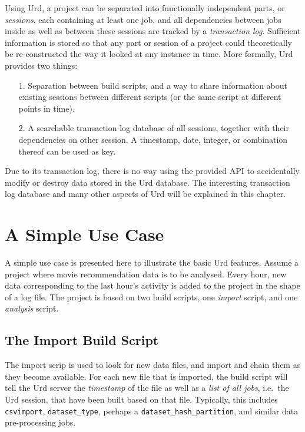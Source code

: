 Using Urd, a project can be separated into functionally independent
parts, or \textsl{sessions}, each containing at least one job, and all
dependencies between jobs inside as well as between these sessions are
tracked by a \textsl{transaction log}.  Sufficient information is
stored so that any part or session of a project could theoretically be
re-constructed the way it looked at any instance in time.  More
formally, Urd provides two things:
\begin{itemize}
\item[1.] Separation between build scripts,
          and a way to share information about existing sessions
          between different scripts (or the same script at different
          points in time).
\item[2.] A searchable transaction log database of all sessions,
          together with their dependencies on other session.  A
          timestamp, date, integer, or combination thereof can be used
          as key.
\end{itemize}
Due to its transaction log, there is no way using the provided API to
accidentally modify or destroy data stored in the Urd database.  The
interesting transaction log database and many other aspects of Urd
will be explained in this chapter.





\section{A Simple Use Case}

A simple use case is presented here to illustrate the basic Urd
features.  Assume a project where movie recommendation data is to be
analysed.  Every hour, new data corresponding to the last hour's
activity is added to the project in the shape of a log file.  The
project is based on two build scripts, one \textsl{import} script, and
one \textsl{analysis} script.

\subsection{The Import Build Script}
The import scrip is used to look for new data files, and import and
chain them as they become available.  For each new file that is
imported, the build script will tell the Urd server
the \textsl{timestamp} of the file as well as a \textsl{list of all
jobs}, i.e.\ the Urd session, that have been built based on that file.
Typically, this includes \texttt{csvimport}, \texttt{dataset\_type},
perhaps a \texttt{dataset\_hash\_partition}, and similar data
pre-processing jobs.



